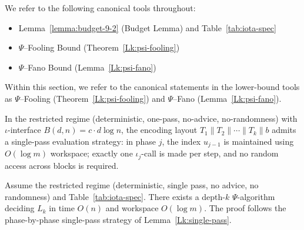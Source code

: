\begin{remark}
We refer to the following canonical tools throughout:
\begin{itemize}
  \item Lemma~\ref{lemma:budget-9-2} (Budget Lemma) and Table~\ref{tab:iota-spec}
  \item $\Psi$--Fooling Bound (Theorem~\ref{Lk:psi-fooling})
  \item $\Psi$--Fano Bound (Lemma~\ref{Lk:psi-fano})
\end{itemize}
\end{remark}


\begin{remark}\label{Lk:aliases}
Within this section, we refer to the canonical statements in the lower-bound tools as $\Psi$--Fooling (Theorem~\ref{Lk:psi-fooling}) and $\Psi$--Fano (Lemma~\ref{Lk:psi-fano}).
\end{remark}

\begin{lemma}\label{Lk:single-pass}
In the restricted regime (deterministic, one-pass, no-advice, no-randomness) with $\iota$-interface $B(d,n)=c\cdot d\log n$, the encoding layout $T_1\parallel T_2\parallel\cdots\parallel T_k\parallel b$ admits a single-pass evaluation strategy: in phase $j$, the index $u_{j-1}$ is maintained using $O(\log m)$ workspace; exactly one $\iota_j$-call is made per step, and no random access across blocks is required.
\end{lemma}

\begin{theorem}[UB at depth $k$]\label{Lk:ub-main}
Assume the restricted regime (deterministic, single pass, no advice, no randomness) and Table~\ref{tab:iota-spec}. There exists a depth-$k$ $\Psi$-algorithm deciding $L_k$ in time $O(n)$ and workspace $O(\log m)$. The proof follows the phase-by-phase single-pass strategy of Lemma~\ref{Lk:single-pass}.
\end{theorem}

